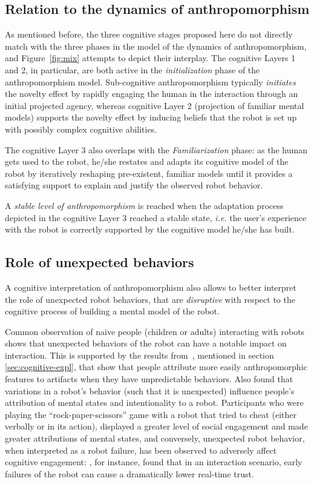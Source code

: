\documentclass{frontiersSCNS} %
\newcommand{\ie}{\textit{i.e.}\xspace}
\begin{document}
\subsection{Relation to the dynamics of anthropomorphism}

As mentioned before, the three cognitive stages proposed here do not directly
match with the three phases in the model of the dynamics of anthropomorphism,
and Figure~\ref{fig:mix} attempts to depict their interplay.
The cognitive Layers 1 and 2, in particular, are both active in the
\emph{initialization} phase of the anthropomorphism model. Sub-cognitive
anthropomorphism typically \emph{initiates} the novelty effect by rapidly
engaging the human in the interaction through an initial projected agency,
whereas cognitive Layer 2 (projection of familiar mental models) supports the
novelty effect by inducing beliefs that the robot is set up with possibly
complex cognitive abilities.

The cognitive Layer 3 also overlaps with the \emph{Familiarization} phase: as
the human gets used to the robot, he/she restates and adapts its
cognitive model of the robot by iteratively reshaping pre-existent, familiar
models until it provides a satisfying support to explain and justify the
observed robot behavior.

A \emph{stable level of anthropomorphism} is reached when the adaptation process
depicted in the cognitive Layer 3 reached a stable state, \ie the user's
experience with the robot is correctly supported by the cognitive model he/she
has built.


\subsection{Role of unexpected behaviors}
\label{sec:disruptive}

A cognitive interpretation of anthropomorphism also allows to better interpret
the role of unexpected robot behaviors, that are \emph{disruptive} with respect
to the cognitive process of building a mental model of the robot.

Common observation of naive people (children or adults) interacting with robots
shows that unexpected behaviors of the robot can have a notable impact on
interaction. This is supported by the results from~\citet{Waytz2010}, mentioned
in section \ref{sec:cognitive-expl}, that show that people attribute more easily
anthropomorphic features to artifacts when they have unpredictable behaviors.
Also \cite{short_no_2010} found that variations in a robot's behavior (such that
it is unexpected) influence people's attribution of mental states and
intentionality to a robot. Participants who were playing the
``rock-paper-scissors'' game with a robot that tried to cheat (either verbally
or in its action), displayed a greater level of social engagement and made
greater attributions of mental states, and conversely, unexpected robot
behavior, when interpreted as a robot failure, has been observed to adversely
affect cognitive engagement: \cite{desai_impact_2013}, for instance, found that
in an interaction scenario, early failures of the robot can cause a dramatically
lower real-time trust.
\end{document}
